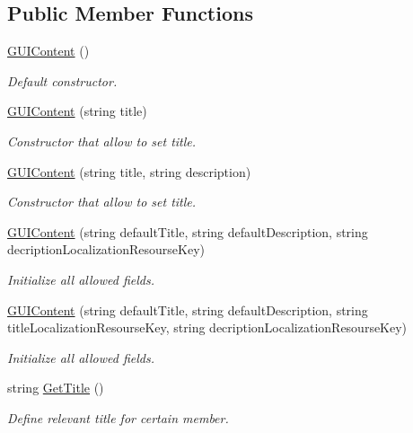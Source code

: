 \subsection*{Public Member Functions}
\begin{DoxyCompactItemize}
\item 
\mbox{\hyperlink{class_wpf_handler_1_1_u_i_1_1_g_u_i_content_a94df176704a9da39956a31d4cc1f3aeb}{G\+U\+I\+Content}} ()
\begin{DoxyCompactList}\small\item\em Default constructor. \end{DoxyCompactList}\item 
\mbox{\hyperlink{class_wpf_handler_1_1_u_i_1_1_g_u_i_content_a4608943cf14878430faed858fb93b6fa}{G\+U\+I\+Content}} (string title)
\begin{DoxyCompactList}\small\item\em Constructor that allow to set title. \end{DoxyCompactList}\item 
\mbox{\hyperlink{class_wpf_handler_1_1_u_i_1_1_g_u_i_content_a1b6b06ba3dceb601146432dc2366240f}{G\+U\+I\+Content}} (string title, string description)
\begin{DoxyCompactList}\small\item\em Constructor that allow to set title. \end{DoxyCompactList}\item 
\mbox{\hyperlink{class_wpf_handler_1_1_u_i_1_1_g_u_i_content_a04d4c3d50ac71b80f193a3f8539a70ac}{G\+U\+I\+Content}} (string default\+Title, string default\+Description, string decription\+Localization\+Resourse\+Key)
\begin{DoxyCompactList}\small\item\em Initialize all allowed fields. \end{DoxyCompactList}\item 
\mbox{\hyperlink{class_wpf_handler_1_1_u_i_1_1_g_u_i_content_a20eef2a05ca7432cdb0b56731f1ec47b}{G\+U\+I\+Content}} (string default\+Title, string default\+Description, string title\+Localization\+Resourse\+Key, string decription\+Localization\+Resourse\+Key)
\begin{DoxyCompactList}\small\item\em Initialize all allowed fields. \end{DoxyCompactList}\item 
string \mbox{\hyperlink{class_wpf_handler_1_1_u_i_1_1_g_u_i_content_a06b4859ce09ed1dc91545154cdb9d5c3}{Get\+Title}} ()
\begin{DoxyCompactList}\small\item\em Define relevant title for certain member. \end{DoxyCompactList}\item 

\end{DoxyCompactItemize}
